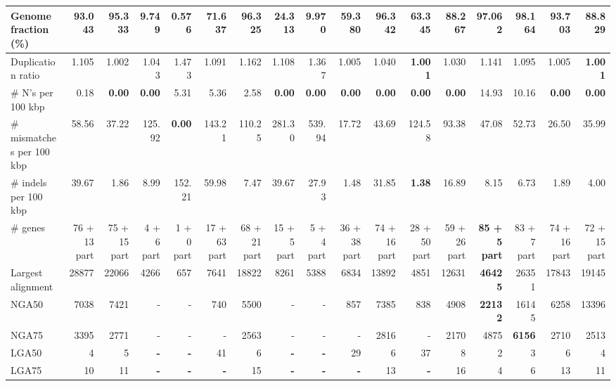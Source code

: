 \documentclass[12pt,a4paper]{article}
\begin{document}
\begin{table}[ht]
\begin{center}
\begin{tabular}{|l*{16}{|r}|}
Genome fraction (\%) & 93.043 & 95.333 & 9.749 & 0.576 & 71.637 & 96.325 & 24.313 & 9.970 & 59.380 & 96.342 & 63.345 & 88.267 & 97.062 & {\bf 98.164} & 93.703 & 88.829 \\ \hline
Duplication ratio & 1.105 & 1.002 & 1.043 & 1.473 & 1.091 & 1.162 & 1.108 & 1.367 & 1.005 & 1.040 & {\bf 1.001} & 1.030 & 1.141 & 1.095 & 1.005 & {\bf 1.001} \\ \hline
\# N's per 100 kbp & 0.18 & {\bf 0.00} & {\bf 0.00} & 5.31 & 5.36 & 2.58 & {\bf 0.00} & {\bf 0.00} & {\bf 0.00} & {\bf 0.00} & {\bf 0.00} & {\bf 0.00} & 14.93 & 10.16 & {\bf 0.00} & {\bf 0.00} \\ \hline
\# mismatches per 100 kbp & 58.56 & 37.22 & 125.92 & {\bf 0.00} & 143.21 & 110.25 & 281.30 & 539.94 & 17.72 & 43.69 & 124.58 & 93.38 & 47.08 & 52.73 & 26.50 & 35.99 \\ \hline
\# indels per 100 kbp & 39.67 & 1.86 & 8.99 & 152.21 & 59.98 & 7.47 & 39.67 & 27.93 & 1.48 & 31.85 & {\bf 1.38} & 16.89 & 8.15 & 6.73 & 1.89 & 4.00 \\ \hline
\# genes & 76 + 13 part & 75 + 15 part & 4 + 6 part & 1 + 0 part & 17 + 63 part & 68 + 21 part & 15 + 5 part & 5 + 4 part & 36 + 38 part & 74 + 16 part & 28 + 50 part & 59 + 26 part & {\bf 85 + 5 part} & 83 + 7 part & 74 + 16 part & 72 + 15 part \\ \hline
Largest alignment & 28877 & 22066 & 4266 & 657 & 7641 & 18822 & 8261 & 5388 & 6834 & 13892 & 4851 & 12631 & {\bf 46425} & 26351 & 17843 & 19145 \\ \hline
NGA50 & 7038 & 7421 & - & - & 740 & 5500 & - & - & 857 & 7385 & 838 & 4908 & {\bf 22132} & 16145 & 6258 & 13396 \\ \hline
NGA75 & 3395 & 2771 & - & - & - & 2563 & - & - & - & 2816 & - & 2170 & 4875 & {\bf 6156} & 2710 & 2513 \\ \hline
LGA50 & 4 & 5 & {\bf -} & {\bf -} & 41 & 6 & {\bf -} & {\bf -} & 29 & 6 & 37 & 8 & 2 & 3 & 6 & 4 \\ \hline
LGA75 & 10 & 11 & {\bf -} & {\bf -} & {\bf -} & 15 & {\bf -} & {\bf -} & {\bf -} & 13 & {\bf -} & 16 & 4 & 6 & 13 & 11 \\ \hline
\end{tabular}
\end{center}
\end{table}
\end{document}
